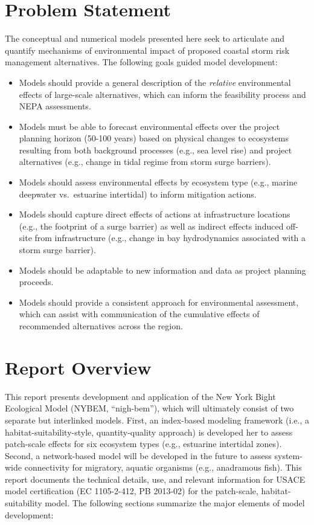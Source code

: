 \documentclass[
]{book}
\begin{document}
\hypertarget{problem-statement}{%
\section{Problem Statement}\label{problem-statement}}

The conceptual and numerical models presented here seek to articulate and quantify mechanisms of environmental impact of proposed coastal storm risk management alternatives. The following goals guided model development:

\begin{itemize}
\item
  Models should provide a general description of the \emph{relative} environmental effects of large-scale alternatives, which can inform the feasibility process and NEPA assessments.
\item
  Models must be able to forecast environmental effects over the project planning horizon (50-100 years) based on physical changes to ecosystems resulting from both background processes (e.g., sea level rise) and project alternatives (e.g., change in tidal regime from storm surge barriers).
\item
  Models should assess environmental effects by ecosystem type (e.g., marine deepwater vs.~estuarine intertidal) to inform mitigation actions.
\item
  Models should capture direct effects of actions at infrastructure locations (e.g., the footprint of a surge barrier) as well as indirect effects induced off-site from infrastructure (e.g., change in bay hydrodynamics associated with a storm surge barrier).
\item
  Models should be adaptable to new information and data as project planning proceeds.
\item
  Models should provide a consistent approach for environmental assessment, which can assist with communication of the cumulative effects of recommended alternatives across the region.
\end{itemize}

\hypertarget{report-overview}{%
\section{Report Overview}\label{report-overview}}

This report presents development and application of the New York Bight Ecological Model (NYBEM, ``nigh-bem''), which will ultimately consist of two separate but interlinked models. First, an index-based modeling framework (i.e., a habitat-suitability-style, quantity-quality approach) is developed her to assess patch-scale effects for six ecosystem types (e.g., estuarine intertidal zones). Second, a network-based model will be developed in the future to assess system-wide connectivity for migratory, aquatic organisms (e.g., anadramous fish). This report documents the technical details, use, and relevant information for USACE model certification (EC 1105-2-412, PB 2013-02) for the patch-scale, habitat-suitability model. The following sections summarize the major elements of model development:
\end{document}
